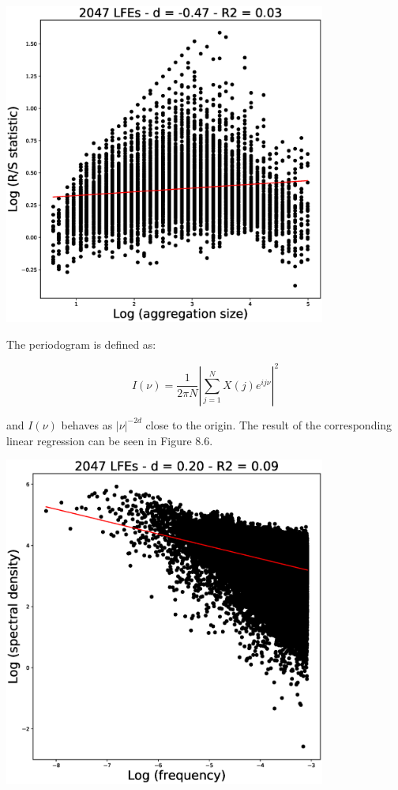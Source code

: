 \documentclass[methods.tex]{subfiles}
\begin{document}
\begin{center}
\includegraphics[width=300pt, trim={0cm 0cm 0cm 0cm},clip]{Figures/longrange/RS.eps}
\captionsetup{type=figure}
\end{center}

The periodogram  is defined as:

\begin{equation}
I \left( \nu \right) = \frac{1}{2 \pi N} \left| \sum_{j = 1}^N X \left( j \right) e^{i j \nu} \right| ^2
\end{equation}

and $I \left( \nu \right)$ behaves as $\left| \nu \right| ^{- 2 d}$ close to the origin. The result of the corresponding linear regression can be seen in Figure 8.6.

\begin{center}
\includegraphics[width=300pt, trim={0cm 0cm 0cm 0cm},clip]{Figures/longrange/periodogram.eps}
\captionsetup{type=figure}
\end{center}
\end{document}

